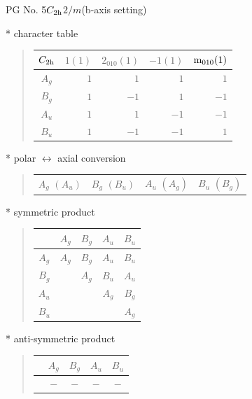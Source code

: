 \documentclass[fleqn,8pt,landscape]{jsarticle}
\begin{document}
\setcounter{MaxMatrixCols}{32}

\renewcommand{\tablename}{Table~}
\renewcommand{\figurename}{Figure~}
\begin{center}
\LARGE
PG No. 5\quad$C_{\rm 2h}$\quad$2/m$\quad(b-axis setting)\quad[ monoclinic ]
\end{center}

* character table
\begin{quote}
\begin{tabular}{crrrr} \hline \hline
$ C_{\rm 2h} $ & $ 1(1) $ & $ 2{}_{010}(1) $ & $ -1(1) $ & $ {\rm m}_{010}(1) $ \\ \hline
$ A_{g} $ & $ 1 $ & $ 1 $ & $ 1 $ & $ 1 $ \\
$ B_{g} $ & $ 1 $ & $ -1 $ & $ 1 $ & $ -1 $ \\
$ A_{u} $ & $ 1 $ & $ 1 $ & $ -1 $ & $ -1 $ \\
$ B_{u} $ & $ 1 $ & $ -1 $ & $ -1 $ & $ 1 $ \\
 \hline \hline
\end{tabular}
\end{quote}

* polar $\leftrightarrow$ axial conversion
\begin{quote}
\begin{tabular}{cccc}
$ A_{g}\,\,(A_{u}) $ & $ B_{g}\,\,(B_{u}) $ & $ A_{u}\,\,(A_{g}) $ & $ B_{u}\,\,(B_{g}) $
\end{tabular}
\end{quote}

* symmetric product
\begin{quote}
\begin{tabular}{c|cccc} \hline \hline
 & $ A_{g} $ & $ B_{g} $ & $ A_{u} $ & $ B_{u} $ \\ \hline
$ A_{g} $ & $ A_{g} $ & $ B_{g} $ & $ A_{u} $ & $ B_{u} $ \\
$ B_{g} $ & $  $ & $ A_{g} $ & $ B_{u} $ & $ A_{u} $ \\
$ A_{u} $ & $  $ & $  $ & $ A_{g} $ & $ B_{g} $ \\
$ B_{u} $ & $  $ & $  $ & $  $ & $ A_{g} $ \\
 \hline \hline
\end{tabular}
\end{quote}

* anti-symmetric product
\begin{quote}
\begin{tabular}{ccccc} \hline \hline
 & $ A_{g} $ & $ B_{g} $ & $ A_{u} $ & $ B_{u} $ \\ \hline
$  $ & $ - $ & $ - $ & $ - $ & $ - $ \\
 \hline \hline
\end{tabular}
\end{quote}
\end{document}

